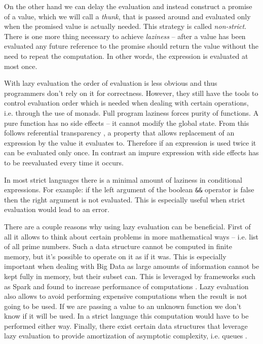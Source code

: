 \documentclass[en]{pracamgr}
\begin{document}
On the other hand we can delay the evaluation and instead construct
a promise of a value, which we will call a \textit{thunk}, that is passed around
and evaluated only when the promised value is actually needed.
This strategy is called \textit{non-strict}. There is one more thing
necessary to achieve \textit{laziness} -- after a value has been evaluated
any future reference to the promise should return the value without
the need to repeat the computation. In other words, the expression
is evaluated at most once.

With lazy evaluation the order of evaluation is less obvious and thus
programmers don't rely on it for correctness. However, they still have
the tools to control evaluation order which is needed when dealing with
certain operations, i.e. through the use of monads. 
Full program laziness forces purity of functions.
A pure function has no side effects -- it cannot modify the global state.
From this follows referential transparency \cite{referentialTransparency},
a property that allows
replacement of an expression by the value it evaluates to.
Therefore if an expression is used twice it can be evaluated only once.
In contrast an impure expression with side effects has to be reevaluated
every time it occurs.

In most strict languages there is a minimal amount of laziness
in conditional expressions. For example: if the left argument of the
boolean \texttt{\&\&} operator is false then the right argument is not
evaluated. This is especially useful when strict evaluation would lead
to an error.

There are a couple reasons why using lazy evaluation can be beneficial.
First of all it allows to think about certain problems in more mathematical
ways -- i.e. list of all prime numbers. Such a data structure cannot
be computed in finite memory, but it's possible to operate on it as if it
was. This is especially important when dealing with Big Data as large
amounts of information cannot be kept fully in memory, but their subset can.
This is leveraged by frameworks such as Spark and found to increase performance
of computations \cite{lazySpark}. Lazy evaluation also allows to avoid
performing expensive computations when the result is not going to be used.
If we are passing a value to an unknown function we don't know if it 
will be used. In a strict language this computation would have to
be performed either way. Finally, there exist certain data structures that
leverage lazy evaluation to provide amortization of asymptotic complexity,
i.e. queues \cite{amortized}.
\end{document}
